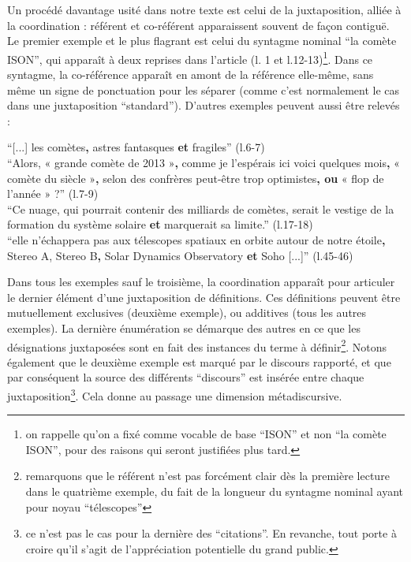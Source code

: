 \documentclass[a4paper,10pt]{article}
\begin{document}
			Un procédé davantage usité dans notre texte est celui de la juxtaposition, alliée à la coordination : référent et co-référent apparaissent souvent de façon contiguë.\\
			Le premier exemple et le plus flagrant est celui du syntagme nominal ``la comète ISON'', qui apparaît à deux reprises dans l'article (l. 1 et l.12-13)\footnote{on rappelle qu'on a fixé comme vocable de base ``ISON'' et non ``la comète ISON'', pour des raisons qui seront justifiées plus tard.}. Dans ce syntagme, la co-référence apparaît en amont de la référence elle-même, sans même un signe de ponctuation pour les séparer (comme c'est normalement le cas dans une juxtaposition ``standard''). D'autres exemples peuvent aussi être relevés :
			\begin{center}
				\footnotesize
				\begin{minipage}{0.7\textwidth}
					``[...] les comètes\textbf{,} astres fantasques \textbf{et} fragiles'' (l.6-7)\\
					``Alors, « grande comète de 2013 »\textbf{,} comme je l'espérais ici voici quelques mois\textbf{,} « comète du siècle »\textbf{,} selon des confrères peut-être trop optimistes\textbf{, ou} « flop de l'année » ?'' (l.7-9)\\
					``Ce nuage, qui pourrait contenir des milliards de comètes, serait le vestige de la formation du système solaire \textbf{et} marquerait sa limite.'' (l.17-18)\\
					``elle n'échappera pas aux télescopes spatiaux en orbite autour de notre étoile\textbf{,} Stereo A, Stereo B\textbf{,} Solar Dynamics Observatory \textbf{et} Soho [...]'' (l.45-46)
				\end{minipage}
			\end{center}
			Dans tous les exemples sauf le troisième, la coordination apparaît pour articuler le dernier élément d'une juxtaposition de définitions. Ces définitions peuvent être mutuellement exclusives (deuxième exemple), ou additives (tous les autres exemples). La dernière énumération se démarque des autres en ce que les désignations juxtaposées sont en fait des instances du terme à définir\footnote{remarquons que le référent n'est pas forcément clair dès la première lecture dans le quatrième exemple, du fait de la longueur du syntagme nominal ayant pour noyau ``télescopes''}. Notons également que le deuxième exemple est marqué par le discours rapporté, et que par conséquent la source des différents ``discours'' est insérée entre chaque juxtaposition\footnote{ce n'est pas le cas pour la dernière des ``citations''. En revanche, tout porte à croire qu'il s'agit de l'appréciation potentielle du grand public.}. Cela donne au passage une dimension métadiscursive.\\
\end{document}
